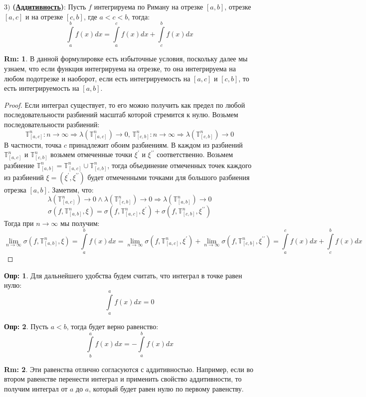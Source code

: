 \documentclass[12pt]{article}
\newcommand{\MTB}{\mathbb{T}}
\theoremstyle{definition}
\newtheorem{defn}{Опр:}
\newtheorem{rem}{Rm:}
\newcommand{\ddint}[2]{\displaystyle\int\limits_{#1}^{#2}}
\begin{document}
$3)$ \textbf{(\uline{Аддитивность})}: Пусть $f$ интегрируема по Риману на отрезке $[a,b]$, отрезке $[a,c]$ и на отрезке $[c,b]$, где $a < c < b$, тогда:
$$
	\ddint{a}{b}f(x)dx = \ddint{a}{c}f(x)dx + \ddint{c}{b}f(x)dx
$$
\begin{rem}
	В данной формулировке есть избыточные условия, поскольку далее мы узнаем, что если функция интегрируема на отрезке, то она интегрируема на любом подотрезке и наоборот, если есть интегрируемость на $[a,c]$ и $[c,b]$, то есть интегрируемость на $[a,b]$.
\end{rem}
\begin{proof}
	Если интеграл существует, то его можно получить как предел по любой последовательности разбиений масштаб которой стремится к нулю. Возьмем последовательности разбиений: 
	$$
		\MTB_{[a,c]}^n \colon n\to \infty \Rightarrow \lambda\left(\MTB_{[a,c]}^n\right)\to 0, \, \MTB_{[c,b]}^n \colon n\to \infty \Rightarrow \lambda\left(\MTB_{[c,b]}^n\right)\to 0
	$$
	В частности, точка $c$ принадлежит обоим разбиениям. В каждом из разбиений $\MTB_{[a,c]}^n$ и $\MTB_{[c,b]}^n$ возьмем отмеченные точки $\xi^\prime$ и $\xi^{\prime\prime}$ соответственно. Возьмем разбиение $\MTB_{[a,b]}^n = \MTB_{[a,c]}^n \cup \MTB_{[c,b]}^n$, тогда объединение отмеченных точек каждого из разбиений $\xi = (\xi^\prime, \xi^{\prime\prime})$ будет отмеченными точками для большого разбиения отрезка $[a,b]$. Заметим, что:
	$$
		\lambda\left(\MTB_{[a,c]}^n\right)\to 0 \wedge \lambda\left(\MTB_{[c,b]}^n\right)\to 0 \Rightarrow \lambda\left(\MTB_{[a,b]}^n\right)\to 0
	$$
	$$
		\sigma\left(f,\MTB_{[a,b]}^n, \xi\right) = \sigma\left(f,\MTB_{[a,c]}^n, \xi^\prime\right) + \sigma\left(f,\MTB_{[c,b]}^n, \xi^{\prime\prime}\right)
	$$
	Тогда при $n \to \infty$ мы получим:
	$$
		\lim\limits_{n \to \infty} \sigma\left(f,\MTB_{[a,b]}^n, \xi\right) = \ddint{a}{b}f(x)dx = \lim\limits_{n \to \infty}\sigma\left(f,\MTB_{[a,c]}^n, \xi^\prime\right) + \lim\limits_{n \to \infty}\sigma\left(f,\MTB_{[c,b]}^n, \xi^{\prime\prime}\right) = \ddint{a}{c}f(x)dx + \ddint{c}{b}f(x)dx
	$$
\end{proof}
\begin{defn}
	Для дальнейшего удобства будем считать, что интеграл в точке равен нулю: 
	$$
		\ddint{a}{a}f(x)dx = 0
	$$
\end{defn}
\begin{defn}
	Пусть $a < b$, тогда будет верно равенство:
	$$
		\ddint{b}{a}f(x)dx = - \ddint{a}{b}f(x)dx
	$$
\end{defn}
\begin{rem}
	Эти равенства отлично согласуются с аддитивностью. Например, если во втором равенстве перенести интеграл и применить свойство аддитивности, то получим интеграл от $a$ до $a$, который будет равен нулю по первому равенству.
\end{rem}
\end{document}
